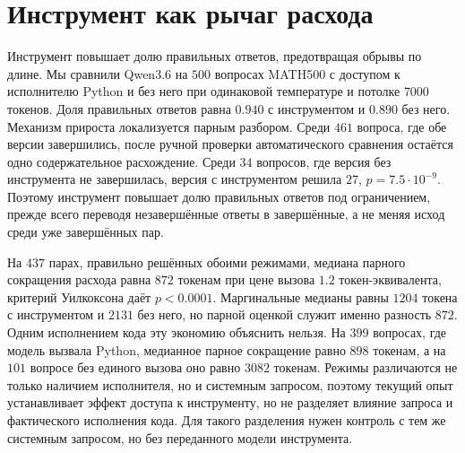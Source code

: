 \documentclass[11pt]{article}
\begin{document}
\section{Инструмент как рычаг расхода}
\label{app:tool}

Инструмент повышает долю правильных ответов, предотвращая обрывы по длине. Мы сравнили Qwen3.6 на $500$ вопросах MATH500 с доступом к исполнителю Python и без него при одинаковой температуре и потолке $7000$ токенов. Доля правильных ответов равна $0.940$ с инструментом и $0.890$ без него. Механизм прироста локализуется парным разбором. Среди $461$ вопроса, где обе версии завершились, после ручной проверки автоматического сравнения остаётся одно содержательное расхождение. Среди $34$ вопросов, где версия без инструмента не завершилась, версия с инструментом решила $27$, $p=7.5\cdot10^{-9}$. Поэтому инструмент повышает долю правильных ответов под ограничением, прежде всего переводя незавершённые ответы в завершённые, а не меняя исход среди уже завершённых пар.

На $437$ парах, правильно решённых обоими режимами, медиана парного сокращения расхода равна $872$ токенам при цене вызова $1.2$ токен-эквивалента, критерий Уилкоксона даёт $p<0.0001$. Маргинальные медианы равны $1204$ токена с инструментом и $2131$ без него, но парной оценкой служит именно разность $872$. Одним исполнением кода эту экономию объяснить нельзя. На $399$ вопросах, где модель вызвала Python, медианное парное сокращение равно $898$ токенам, а на $101$ вопросе без единого вызова оно равно $3082$ токенам. Режимы различаются не только наличием исполнителя, но и системным запросом, поэтому текущий опыт устанавливает эффект доступа к инструменту, но не разделяет влияние запроса и фактического исполнения кода. Для такого разделения нужен контроль с тем же системным запросом, но без переданного модели инструмента.



\end{document}
